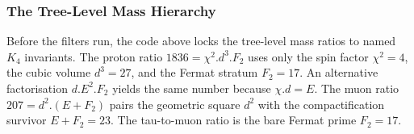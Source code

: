 \documentclass[11pt,a4paper]{book}
\def\cdot{.}%
\begin{document}
\begin{code}
\<%
\\
\>[0]\AgdaSpace{}%
\AgdaSymbol{=}\AgdaSpace{}%
\<%
\\
%
\\[\AgdaEmptyExtraSkip]%
\>[0]\<%
\\
\>[0]\AgdaSpace{}%
\AgdaSymbol{:}\AgdaSpace{}%
\<%
\\
\>[0]\AgdaSpace{}%
\AgdaSymbol{=}\AgdaSpace{}%
\<%
\\
%
\\[\AgdaEmptyExtraSkip]%
\>[0]\AgdaSpace{}%
\AgdaSymbol{:}\AgdaSpace{}%
\AgdaSpace{}%
\AgdaSpace{}%
\<%
\\
\>[0]\AgdaSpace{}%
\AgdaSymbol{=}\AgdaSpace{}%
\<%
\\
%
\\[\AgdaEmptyExtraSkip]%
\>[0]\<%
\\
\>[0]\AgdaSpace{}%
\AgdaSymbol{:}\AgdaSpace{}%
\<%
\\
\>[0]\AgdaSpace{}%
\AgdaSymbol{=}\AgdaSpace{}%
\<%
\\
%
\\[\AgdaEmptyExtraSkip]%
\>[0]\AgdaSpace{}%
\AgdaSymbol{:}\AgdaSpace{}%
\AgdaSpace{}%
\AgdaSpace{}%
\<%
\\
\>[0]\AgdaSpace{}%
\AgdaSymbol{=}\AgdaSpace{}%
\<%
\end{code}

\subsubsection*{The Tree-Level Mass Hierarchy}

Before the filters run, the code above locks the tree-level mass ratios
to named $K_4$ invariants.  The proton ratio $1836 = \chi^2 \cdot d^3 \cdot F_2$
uses only the spin factor $\chi^2 = 4$, the cubic volume $d^3 = 27$,
and the Fermat stratum $F_2 = 17$.  An alternative factorisation
$d \cdot E^2 \cdot F_2$ yields the same number because $\chi \cdot d = E$.
The muon ratio $207 = d^2 \cdot (E + F_2)$ pairs the geometric square $d^2$
with the compactification survivor $E + F_2 = 23$.
The tau-to-muon ratio is the bare Fermat prime $F_2 = 17$.
\end{document}
